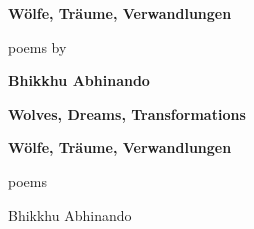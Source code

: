 \documentclass[a4paper]{article}
\title{}
\author{abhinando}
\date{2012-09-01}
\begin{document}
\clearpage{}

{\raggedleft\bfseries
Wölfe, Träume, Verwandlungen 
\par}


\bigskip


\bigskip


\bigskip


\bigskip


\bigskip


\bigskip


\bigskip


\bigskip


\bigskip


\bigskip


\bigskip


\bigskip


\bigskip


\bigskip


\bigskip


\bigskip


\bigskip


\bigskip


\bigskip


\bigskip


\bigskip

{\raggedleft
poems by
\par}

{\raggedleft\bfseries
Bhikkhu Abhinando
\par}


\bigskip


\bigskip


\bigskip


\bigskip

{\bfseries
Wolves, Dreams, Transformations}

{\bfseries
Wölfe, Träume, Verwandlungen}


\bigskip


\bigskip


\bigskip

poems


\bigskip


\bigskip

Bhikkhu Abhinando


\bigskip


\bigskip


\bigskip


\bigskip


\bigskip
\end{document}
